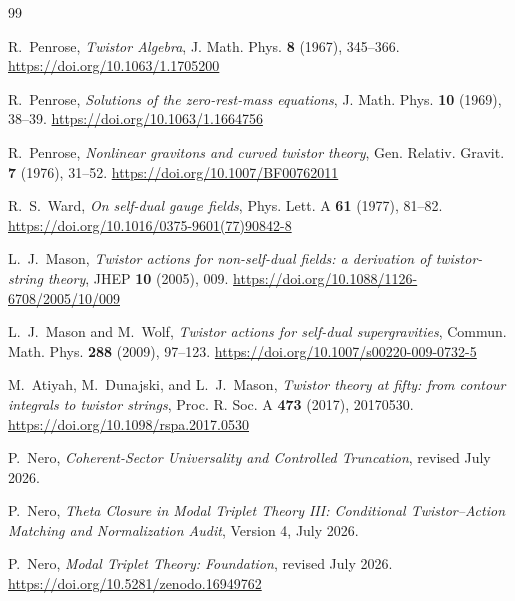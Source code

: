\documentclass[11pt]{article}
\begin{document}
\begin{thebibliography}{99}

R.~Penrose,
\emph{Twistor Algebra},
J. Math. Phys. \textbf{8} (1967), 345--366.
\url{https://doi.org/10.1063/1.1705200}

R.~Penrose,
\emph{Solutions of the zero-rest-mass equations},
J. Math. Phys. \textbf{10} (1969), 38--39.
\url{https://doi.org/10.1063/1.1664756}

R.~Penrose,
\emph{Nonlinear gravitons and curved twistor theory},
Gen. Relativ. Gravit. \textbf{7} (1976), 31--52.
\url{https://doi.org/10.1007/BF00762011}

R.~S.~Ward,
\emph{On self-dual gauge fields},
Phys. Lett. A \textbf{61} (1977), 81--82.
\url{https://doi.org/10.1016/0375-9601(77)90842-8}

L.~J.~Mason,
\emph{Twistor actions for non-self-dual fields: a derivation of
twistor-string theory},
JHEP \textbf{10} (2005), 009.
\url{https://doi.org/10.1088/1126-6708/2005/10/009}

L.~J.~Mason and M.~Wolf,
\emph{Twistor actions for self-dual supergravities},
Commun. Math. Phys. \textbf{288} (2009), 97--123.
\url{https://doi.org/10.1007/s00220-009-0732-5}

M.~Atiyah, M.~Dunajski, and L.~J.~Mason,
\emph{Twistor theory at fifty: from contour integrals to twistor strings},
Proc. R. Soc. A \textbf{473} (2017), 20170530.
\url{https://doi.org/10.1098/rspa.2017.0530}

P.~Nero,
\emph{Coherent-Sector Universality and Controlled Truncation},
revised July 2026.

P.~Nero,
\emph{Theta Closure in Modal Triplet Theory III: Conditional
Twistor--Action Matching and Normalization Audit},
Version 4, July 2026.

P.~Nero,
\emph{Modal Triplet Theory: Foundation},
revised July 2026.
\url{https://doi.org/10.5281/zenodo.16949762}

\end{thebibliography}
\end{document}
